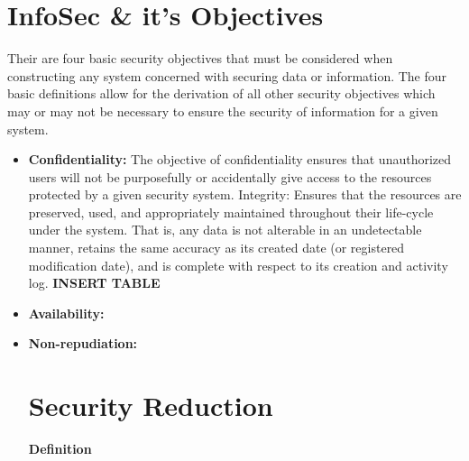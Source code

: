 \section{InfoSec & it's Objectives} 
Their are four basic security objectives that must be considered when constructing any system concerned with securing data or information. The four basic definitions allow for the derivation of all other security objectives which may or may not be
necessary to ensure the security of information for a given system.

\begin{itemize}
\item \textbf{Confidentiality:} The objective of confidentiality ensures that
unauthorized users will not be purposefully or accidentally give access
to the resources protected by a given security system. Integrity:
Ensures that the resources are preserved, used, and appropriately
maintained throughout their life-cycle under the system. That is, any
data is not alterable in an undetectable manner, retains the same
accuracy as its created date (or registered modification date), and is
complete with respect to its creation and activity log. 
\textbf{INSERT TABLE}
\item \textbf{Availability:}
\item \textbf{Non-repudiation:} 

\section{Security Reduction} 

\textbf{Definition}



\end{itemize}
